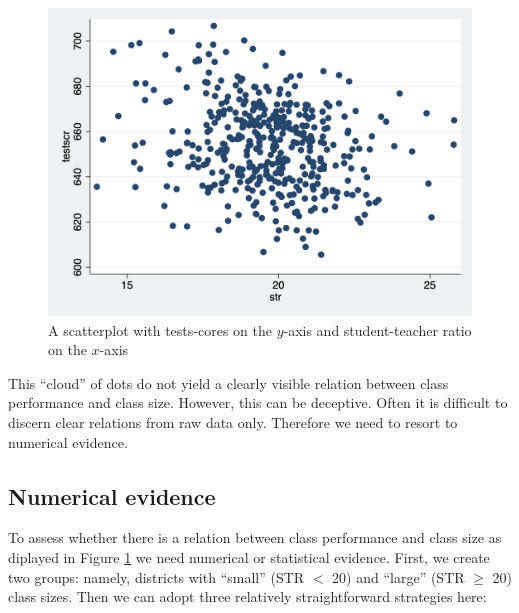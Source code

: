 \documentclass[
]{book}
\begin{document}
\begin{figure}
\includegraphics[width=18.33in]{./figures/scatter} \caption{A scatterplot with tests-cores on the $y$-axis and student-teacher ratio on the $x$-axis}\label{fig:scattercaschool}
\end{figure}

This ``cloud'' of dots do not yield a clearly visible relation between class performance and class size. However, this can be deceptive. Often it is difficult to discern clear relations from raw data only. Therefore we need to resort to numerical evidence.

\hypertarget{sec:numevidence}{%
\subsection{Numerical evidence}\label{sec:numevidence}}

To assess whether there is a relation between class performance and class size as diplayed in Figure \ref{fig:scattercaschool} we need numerical or statistical evidence. First, we create two groups: namely, districts with ``small'' (STR \(<\) 20) and ``large'' (STR \(\geq\) 20) class sizes. Then we can adopt three relatively straightforward strategies here:
\end{document}
